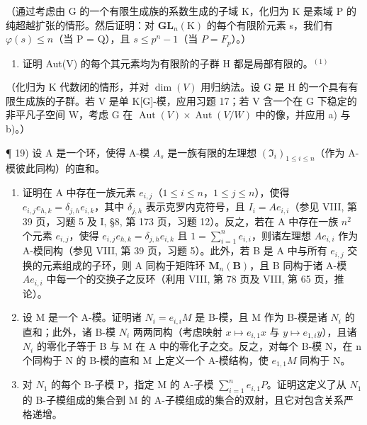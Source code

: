 （通过考虑由 G 的一个有限生成族的系数生成的子域 K，化归为 K 是素域 P 的纯超越扩张的情形。然后证明：对 \(\mathbf{GL}_{n}(\mathrm{K})\) 的每个有限阶元素 s，我们有 \(\varphi(s) \leqslant n\)（当 P = Q），且 \(s \leqslant p^{n} - 1\)（当 \(P = F_{p}\)）。）

\begin{enumerate}
\def\labelenumi{\alph{enumi})}
\setcounter{enumi}{3}
\tightlist
\item
  证明 Aut(V) 的每个其元素均为有限阶的子群 H 都是局部有限的。\(^{(1)}\)
\end{enumerate}

（化归为 K 代数闭的情形，并对 \(\dim(V)\) 用归纳法。设 G 是 H 的一个具有有限生成族的子群。若 V 是单 K{[}G{]}-模，应用习题 17；若 V 含一个在 G 下稳定的非平凡子空间 W，考虑 G 在 \(\operatorname{Aut}(V) \times \operatorname{Aut}(V/W)\) 中的像，并应用 a) 与 b)。）

¶ 19) 设 A 是一个环，使得 A-模 \(A_{s}\) 是一族有限的左理想 \((\mathfrak{I}_{i})_{1\leqslant i\leqslant n}\)（作为 A-模彼此同构）的直和。

\begin{enumerate}
\def\labelenumi{\alph{enumi})}
\item
  证明在 A 中存在一族元素 \(e_{i,j}\)（\(1 \leqslant i \leqslant n\)，\(1 \leqslant j \leqslant n\)），使得 \(e_{i,j}e_{h,k} = \delta_{j,h}e_{i,k}\)，其中 \(\delta_{j,h}\) 表示克罗内克符号，且 \(I_i = Ae_{i,i}\)（参见 VIII, 第 39 页，习题 5 及 I, §8, 第 173 页，习题 12）。反之，若在 A 中存在一族 \(n^2\) 个元素 \(e_{i,j}\)，使得 \(e_{i,j}e_{h,k} = \delta_{j,h}e_{i,k}\) 且 \(1 = \sum_{i=1}^{n} e_{i,i}\)，则诸左理想 \(Ae_{i,i}\) 作为 A-模同构（参见 VIII, 第 39 页，习题 5）。此外，若 B 是 A 中与所有 \(e_{i,j}\) 交换的元素组成的子环，则 A 同构于矩阵环 \(\mathbf{M}_n(\mathbf{B})\)，且 B 同构于诸 A-模 \(Ae_{i,i}\) 中每一个的交换子之反环（利用 VIII, 第 78 页及 VIII, 第 65 页，推论）。
\item
  设 M 是一个 A-模。证明诸 \(N_{i} = e_{i,i}M\) 是 B-模，且 M 作为 B-模是诸 \(N_{i}\) 的直和；此外，诸 B-模 \(N_{i}\) 两两同构（考虑映射 \(x \mapsto e_{i,1}x\) 与 \(y \mapsto e_{1,i}y\)），且诸 \(N_{i}\) 的零化子等于 B 与 M 在 A 中的零化子之交。反之，对每个 B-模 N，在 n 个同构于 N 的 B-模的直和 M 上定义一个 A-模结构，使 \(e_{1,1}M\) 同构于 N。
\item
  对 \(N_{1}\) 的每个 B-子模 P，指定 M 的 A-子模 \(\sum_{i=1}^{n} e_{i,1}P\)。证明这定义了从 \(N_{1}\) 的 B-子模组成的集合到 M 的 A-子模组成的集合的双射，且它对包含关系严格递增。
\end{enumerate}

